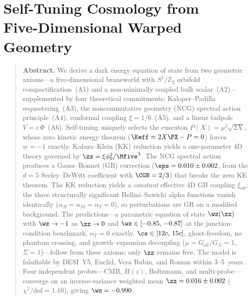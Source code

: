 
\chapter[Self-Tuning Cosmology from 5D Warped Geometry]{Self-Tuning Cosmology from\\Five-Dimensional Warped Geometry}
\label{ch:foundation}

\begin{quote}
\textbf{Abstract.}
We derive a dark energy equation of state from two geometric axioms---a five-dimensional braneworld with $S^1/\mathbb{Z}_2$ orbifold compactification~(A1) and a non-minimally coupled bulk scalar~(A2)---supplemented by four theoretical commitments: Kaloper--Padilla sequestering~(A3), the noncommutative geometry (NCG) spectral action principle~(A4), conformal coupling $\xi = 1/6$~(A5), and a linear tadpole $V = c\,\Phi$~(A6). Self-tuning uniquely selects the cuscuton $P(X) = \mu^2\sqrt{2X}$, whose zero kinetic energy theorem ($\Keff = 2X\PX - P = 0$) forces $w = -1$ exactly. Kaluza--Klein (KK) reduction yields a one-parameter 4D theory governed by $\zz = \xi\phi_0^2/\Mfive^3$. The NCG spectral action produces a Gauss--Bonnet (GB) correction ($\eps = 0.010 \pm 0.002$, from the $d = 5$ Seeley--DeWitt coefficient with $\CGB = 2/3$) that breaks the zero KE theorem. The KK reduction yields a \emph{constant} effective 4D GB coupling $\xi_{\mathrm{eff}}$; the three structurally significant Bellini--Sawicki alpha functions vanish identically ($\alpha_B = \alpha_M = \alpha_T = 0$), so perturbations are GR on a modified background. The predictions---a parametric equation of state $\wz(\zz)$ with $\wz \to -1$ as $\zz \to 0$ and $\wz \in [-0.85,\, -0.87]$ at the junction-condition benchmark, $\alpha_T = 0$ exactly, $\cs \in [12c,\, 15c]$, ghost-freedom, no phantom crossing, and growth--expansion decoupling ($\mu = G_{\mathrm{eff}}/G_N = 1$, $\Sigma = 1$)---follow from these axioms; only $\zz$ remains free. The model is falsifiable by DESI~Y5, Euclid, Vera Rubin, and Roman within 3--5~years. Four independent probes---CMB, $H(z)$, Boltzmann, and multi-probe---converge on an inverse-variance weighted mean $\zz = 0.016 \pm 0.002$ ($\chi^2/\mathrm{dof} = 1.10$), giving $\wz = -0.990$.
\end{quote}

